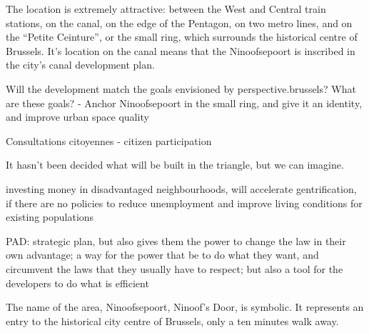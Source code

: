 \documentclass{article}
\begin{document}
The location is extremely attractive: between the West and Central train stations, on the canal, on the edge of the Pentagon, on two metro lines, and on the ``Petite Ceinture'', or the small ring, which surrounds the historical centre of Brussels. It's location on the canal means that the Ninoofsepoort is inscribed in the city's canal development plan.

Will the development match the goals envisioned by perspective.brussels?
What are these goals?
	- Anchor Ninoofsepoort in the small ring, and give it an identity, and improve urban space quality

Consultations citoyennes - citizen participation

It hasn't been decided what will be built in the triangle, but we can imagine.

investing money in disadvantaged neighbourhoods, will accelerate gentrification, if there are no policies to reduce unemployment and improve living conditions for existing populations

PAD: strategic plan, but also gives them the power to change the law in their own advantage; a way for the power that be to do what they want, and circumvent the laws that they usually have to respect; but also a tool for the developers to do what is efficient



The name of the area, Ninoofsepoort, Ninoof's Door, is symbolic. It represents an entry to the historical city centre of Brussels, only a ten minutes walk away. 
\end{document}
